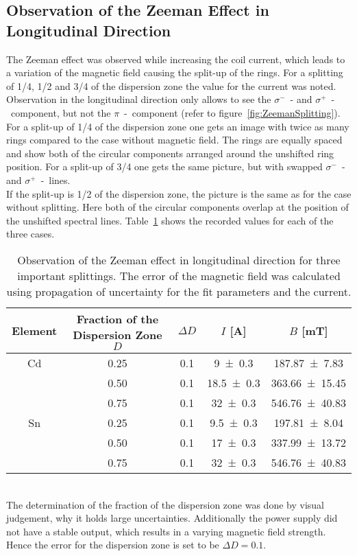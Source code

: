 \subsection{Observation of the Zeeman Effect in Longitudinal Direction}
\label{toc:ObservationZeeman}
The Zeeman effect was observed while increasing the coil current, which leads to a variation of the magnetic field causing the split-up of the rings. 
For a splitting of 1/4, 1/2 and 3/4 of the dispersion zone the value for the current was noted.\\
Observation in the longitudinal direction only allows to see the $\sigma^-$~- and $\sigma^+$~-~component, but not the $\pi$~-~component (refer to figure~\ref{fig:ZeemanSplitting}). 
For a split-up of 1/4 of the dispersion zone one gets an image with twice as many rings compared to the case without magnetic field. 
The rings are equally spaced and show both of the circular components arranged around the unshifted ring position. 
For a split-up of 3/4 one gets the same picture, but with swapped $\sigma^-$~- and $\sigma^+$~-~lines.\\
If the split-up is 1/2 of the dispersion zone, the picture is the same as for the case without splitting. 
Here both of the circular components overlap at the position of the unshifted spectral lines. 
Table~\ref{tab:ObsZeeman} shows the recorded values for each of the three cases.
\begin{table}[ht]
	\centering
	\begin{tabular}{c c c c c}
	Element	& Fraction of the Dispersion Zone $D$	& $\Delta D$	& $I$ [\si{\ampere}]	& $B$ [\si{\milli\tesla}]	\\
	\hline
		Cd	& \num{0.25}	& \num{0.1}	& \num{9 \pm 0.3}	& \num{187.87 \pm 7.83} 	\\
 			& \num{0.50}	& \num{0.1}	& \num{18.5 \pm 0.3}	& \num{363.66 \pm 15.45} 	\\ 
			& \num{0.75}	& \num{0.1}	& \num{32 \pm 0.3}	& \num{546.76 \pm 40.83} 	\\ 
		Sn	& \num{0.25}	& \num{0.1}	& \num{9.5 \pm 0.3}	& \num{197.81 \pm 8.04} 	\\
 			& \num{0.50}	& \num{0.1}	& \num{17 \pm 0.3}	& \num{337.99 \pm 13.72} 	\\ 
			& \num{0.75}	& \num{0.1}	& \num{32 \pm 0.3}	& \num{546.76 \pm 40.83} 	\\
	\end{tabular}
	\caption[Observation of the Zeeman Effect (Longitudinal Direction)]{Observation of the Zeeman effect in longitudinal direction for three important splittings. The error of the magnetic field was calculated using propagation of uncertainty for the fit parameters and the current.}
	\label{tab:ObsZeeman}
\end{table}\\
The determination of the fraction of the dispersion zone was done by visual judgement, why it holds large uncertainties. 
Additionally the power supply did not have a stable output, which results in a varying magnetic field strength. 
Hence the error for the dispersion zone is set to be $\Delta D = \num{0.1}$. 
